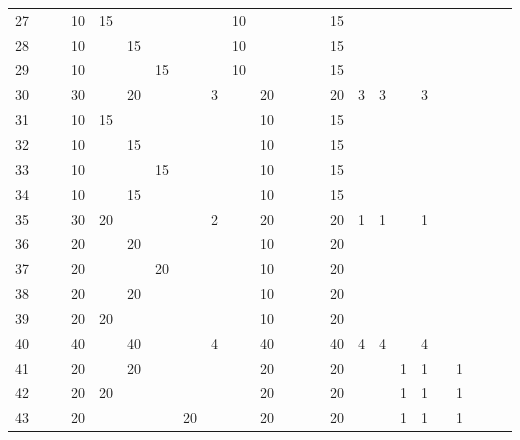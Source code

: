\begin{table}[h!]
\begin{tabular}{r|g c g c g c g c g c g c g c g c g c g c g c g}
  27 &    &    & 10 & 15 &    &    &    &   & 10 &    &    &    &    & 15 &   &   &    &   &   &   &   &   &   \\
  28 &    &    & 10 &    & 15 &    &    &   & 10 &    &    &    &    & 15 &   &   &    &   &   &   &   &   &   \\
  29 &    &    & 10 &    &    & 15 &    &   & 10 &    &    &    &    & 15 &   &   &    &   &   &   &   &   &   \\
  30 &    &    & 30 &    & 20 &    &    & 3 &    & 20 &    &    &    & 20 & 3 & 3 &    & 3 &   &   &   &   &   \\
  31 &    &    & 10 & 15 &    &    &    &   &    & 10 &    &    &    & 15 &   &   &    &   &   &   &   &   &   \\
  32 &    &    & 10 &    & 15 &    &    &   &    & 10 &    &    &    & 15 &   &   &    &   &   &   &   &   &   \\
  33 &    &    & 10 &    &    & 15 &    &   &    & 10 &    &    &    & 15 &   &   &    &   &   &   &   &   &   \\
  34 &    &    & 10 &    & 15 &    &    &   &    & 10 &    &    &    & 15 &   &   &    &   &   &   &   &   &   \\
  35 &    &    & 30 & 20 &    &    &    & 2 &    & 20 &    &    &    & 20 & 1 & 1 &    & 1 &   &   &   &   &   \\
  36 &    &    & 20 &    & 20 &    &    &   &    & 10 &    &    &    & 20 &   &   &    &   &   &   &   &   &   \\
  37 &    &    & 20 &    &    & 20 &    &   &    & 10 &    &    &    & 20 &   &   &    &   &   &   &   &   &   \\
  38 &    &    & 20 &    & 20 &    &    &   &    & 10 &    &    &    & 20 &   &   &    &   &   &   &   &   &   \\
  39 &    &    & 20 & 20 &    &    &    &   &    & 10 &    &    &    & 20 &   &   &    &   &   &   &   &   &   \\
  40 &    &    & 40 &    & 40 &    &    & 4 &    & 40 &    &    &    & 40 & 4 & 4 &    & 4 &   &   &   &   &   \\
  41 &    &    & 20 &    & 20 &    &    &   &    & 20 &    &    &    & 20 &   &   & 1  & 1 &   & 1 &   &   &   \\
  42 &    &    & 20 & 20 &    &    &    &   &    & 20 &    &    &    & 20 &   &   & 1  & 1 &   & 1 &   &   &   \\
  43 &    &    & 20 &    &    &    & 20 &   &    & 20 &    &    &    & 20 &   &   & 1  & 1 &   & 1 &   &   &   \\

\end{tabular}
\end{table}
